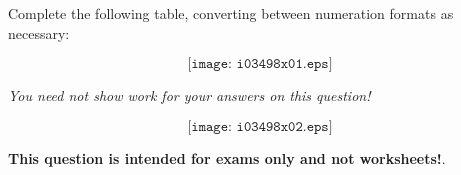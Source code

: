 

Complete the following table, converting between numeration formats as necessary:

$$\texttt{[image: i03498x01.eps]}$$

{\it You need not show work for your answers on this question!}







$$\texttt{[image: i03498x02.eps]}$$







{\bf This question is intended for exams only and not worksheets!}.



